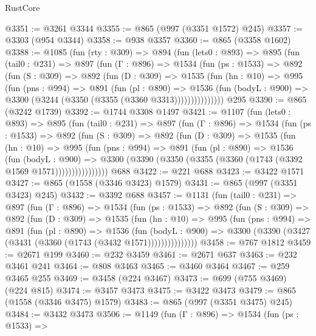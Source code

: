 \begin{lexlean}{RustCore}
\begin{coremodule}
@3351 := @3261 @3344
@3355 := @865 (@997 (@3351 @1572) @245)
@3357 := @3303 (@954 @3344)
@3358 := @938 @3357
@3360 := @865 (@3358 @1602)
@3388 := @1085
    (fun (rty : @309) =>
    @894
      (fun (lets0 : @893) =>
      @895
        (fun (tail0 : @231) =>
        @897
          (fun (Γ : @896) =>
          @1534
            (fun (ps : @1533) =>
            @892
              (fun (S : @309) =>
              @892
                (fun (D : @309) =>
                @1535
                  (fun (hn : @10) =>
                  @995
                    (fun (pns : @994) =>
                    @891
                      (fun (pl : @890) =>
                      @1536
                        (fun (bodyL : @900) =>
                        @3300 (@3244 (@3350 (@3355 (@3360 @3313)))))))))))))))
    @295
@3390 := @865 (@3242 @1739)
@3392 := @1744 @3308 @1497
@3421 := @1107
    (fun (lets0 : @893) =>
    @895
      (fun (tail0 : @231) =>
      @897
        (fun (Γ : @896) =>
        @1534
          (fun (ps : @1533) =>
          @892
            (fun (S : @309) =>
            @892
              (fun (D : @309) =>
              @1535
                (fun (hn : @10) =>
                @995
                  (fun (pns : @994) =>
                  @891
                    (fun (pl : @890) =>
                    @1536
                      (fun (bodyL : @900) =>
                      @3300 (@3390 (@3350 (@3355 (@3360 (@1743 (@3392 @1569 @1571))))))))))))))))
    @688
@3422 := @221 @688
@3423 := @3422 @1571
@3427 := @865 (@1558 (@3346 @3423) @1579)
@3431 := @865 (@997 (@3351 @3423) @245)
@3432 := @3392 @688
@3457 := @1131
    (fun (tail0 : @231) =>
    @897
      (fun (Γ : @896) =>
      @1534
        (fun (ps : @1533) =>
        @892
          (fun (S : @309) =>
          @892
            (fun (D : @309) =>
            @1535
              (fun (hn : @10) =>
              @995
                (fun (pns : @994) =>
                @891
                  (fun (pl : @890) =>
                  @1536
                    (fun (bodyL : @900) =>
                    @3300 (@3390 (@3427 (@3431 (@3360 (@1743 (@3432 @1571)))))))))))))))
@3458 := @767 @1812
@3459 := @2671 @199
@3460 := @232 @3459
@3461 := @2671 @637
@3463 := @232 @3461 @241
@3464 := @808 @3463
@3465 := @3460 @3464
@3467 := @259 @3465 @255
@3469 := @3458 (@224 @3467)
@3473 := @699 (@755 @3469) (@224 @815)
@3474 := @3457 @3473
@3475 := @3422 @3473
@3479 := @865 (@1558 (@3346 @3475) @1579)
@3483 := @865 (@997 (@3351 @3475) @245)
@3484 := @3432 @3473
@3506 := @1149
    (fun (Γ : @896) =>
    @1534
      (fun (ps : @1533) =>

\end{coremodule}
\end{lexlean}
